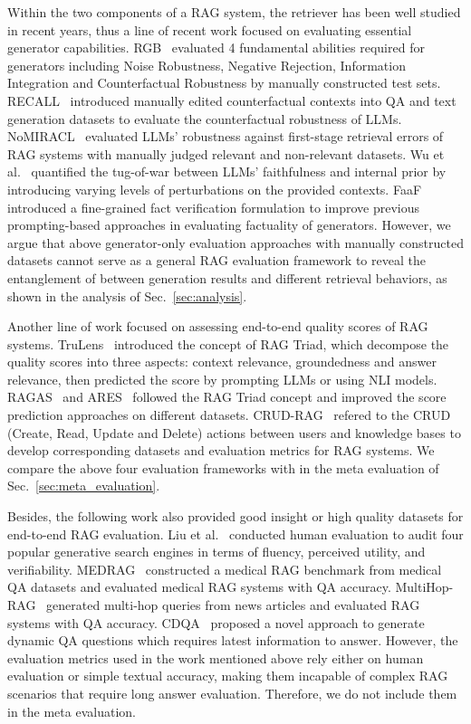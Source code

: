 Within the two components of a RAG system, the retriever has been well studied in recent years, thus a line of recent work focused on evaluating essential generator capabilities. 
RGB~\cite{chen2024benchmarking} evaluated 4 fundamental abilities required for generators including Noise Robustness, Negative Rejection, Information Integration and Counterfactual Robustness by manually constructed test sets. 
RECALL~\cite{liu2023recall} introduced manually edited counterfactual contexts into QA and text generation datasets to evaluate the counterfactual robustness of LLMs. 
NoMIRACL~\cite{thakur2023nomiracl} evaluated LLMs' robustness against first-stage retrieval errors of RAG systems with manually judged relevant and non-relevant datasets. 
Wu et al.~\cite{wu2024faithful} quantified the tug-of-war between LLMs’ faithfulness and internal prior by introducing varying levels of perturbations on the provided contexts.
FaaF~\cite{katranidis2024faaf} introduced a fine-grained fact verification formulation to improve previous prompting-based approaches in evaluating factuality of generators.
However, we argue that above generator-only evaluation approaches with manually constructed datasets cannot serve as a general RAG evaluation framework to reveal the entanglement of between generation results and different retrieval behaviors, as shown in the analysis of Sec.~\ref{sec:analysis}.

Another line of work focused on assessing end-to-end quality scores of RAG systems. TruLens~\cite{TruLens} introduced the concept of RAG Triad, which decompose the quality scores into three aspects: context relevance, groundedness and answer relevance, then predicted the score by prompting LLMs or using NLI models. RAGAS~\cite{es2023ragas} and ARES~\cite{saadfalcon2023ares} followed the RAG Triad concept and improved the score prediction approaches on different datasets. CRUD-RAG~\cite{lyu2024crud} refered to the CRUD (Create, Read, Update and Delete) actions between users and knowledge bases to develop corresponding datasets and evaluation metrics for RAG systems. We compare the above four evaluation frameworks with \benchname\space in the meta evaluation of Sec.~\ref{sec:meta_evaluation}.

Besides, the following work also provided good insight or high quality datasets for end-to-end RAG evaluation. Liu et al.~\cite{liu2023evaluating} conducted human evaluation to audit four popular generative search engines in terms of fluency, perceived utility, and verifiability. MEDRAG~\cite{xiong2024benchmarking} constructed a medical RAG benchmark from medical QA datasets and evaluated medical RAG systems with QA accuracy. MultiHop-RAG~\cite{tang2024multihop} generated multi-hop queries from news articles and evaluated RAG systems with QA accuracy. CDQA~\cite{xu2024let} proposed a novel approach to generate dynamic QA questions which requires latest information to answer. However, the evaluation metrics used in the work mentioned above rely either on human evaluation or simple textual accuracy, making them incapable of complex RAG scenarios that require long answer evaluation. Therefore, we do not include them in the meta evaluation.
